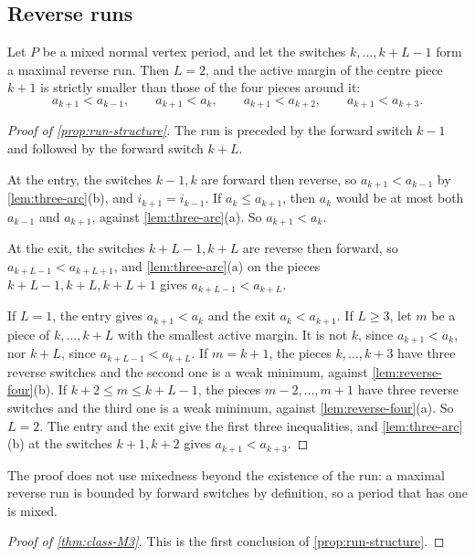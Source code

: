 \subsection{Reverse runs}\label{sec:rev-runs}

\begin{proposition}\label{prop:run-structure}
Let $P$ be a mixed normal vertex period, and let the switches $k,\dots,k+L-1$ form a maximal
reverse run. Then $L=2$, and the active margin of the centre piece $k+1$ is strictly smaller
than those of the four pieces around it:
\[
  a_{k+1}<a_{k-1},\qquad a_{k+1}<a_k,\qquad a_{k+1}<a_{k+2},\qquad a_{k+1}<a_{k+3}.
\]
\end{proposition}

\begin{proof}[Proof of \cref{prop:run-structure}]
The run is preceded by the forward switch $k-1$ and followed by the forward switch $k+L$.

At the entry, the switches $k-1,k$ are forward then reverse, so $a_{k+1}<a_{k-1}$ by
\cref{lem:three-arc}(b), and $i_{k+1}=i_{k-1}$. If $a_k\le a_{k+1}$, then $a_k$ would be at most
both $a_{k-1}$ and $a_{k+1}$, against \cref{lem:three-arc}(a). So $a_{k+1}<a_k$.

At the exit, the switches $k+L-1,k+L$ are reverse then forward, so $a_{k+L-1}<a_{k+L+1}$, and
\cref{lem:three-arc}(a) on the pieces $k+L-1,k+L,k+L+1$ gives $a_{k+L-1}<a_{k+L}$.

If $L=1$, the entry gives $a_{k+1}<a_k$ and the exit $a_k<a_{k+1}$. If $L\ge3$, let $m$ be a
piece of $k,\dots,k+L$ with the smallest active margin. It is not $k$, since $a_{k+1}<a_k$, nor
$k+L$, since $a_{k+L-1}<a_{k+L}$. If $m=k+1$, the pieces $k,\dots,k+3$ have three reverse switches
and the second one is a weak minimum, against \cref{lem:reverse-four}(b). If
$k+2\le m\le k+L-1$, the pieces $m-2,\dots,m+1$ have three reverse switches and the third one is a
weak minimum, against \cref{lem:reverse-four}(a). So $L=2$. The entry and the exit give the first
three inequalities, and \cref{lem:three-arc}(b) at the switches $k+1,k+2$ gives
$a_{k+1}<a_{k+3}$.
\end{proof}

The proof does not use mixedness beyond the existence of the run: a maximal reverse run is
bounded by forward switches by definition, so a period that has one is mixed.

\begin{proof}[Proof of \cref{thm:class-M3}]
This is the first conclusion of \cref{prop:run-structure}.
\end{proof}

